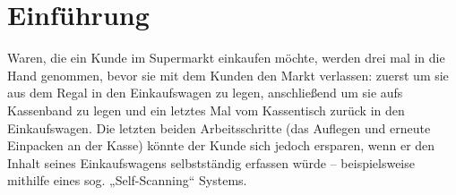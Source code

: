 \seKurzfassung[]




%
%
%
%
\seInhaltsverzeichnis[%
einrueckung=ja,
gliederungsebenen=4
]




%
%
%
%






%
\nocite{Gil:Evo}
\chapter{Einführung}
Waren, die ein Kunde im Supermarkt einkaufen möchte, werden drei mal in die Hand genommen, bevor sie mit dem Kunden den Markt verlassen: zuerst um sie aus dem Regal in den Einkaufswagen zu legen, anschließend um sie aufs Kassenband zu legen und ein letztes Mal vom Kassentisch zurück in den Einkaufswagen. Die letzten beiden Arbeitsschritte (das Auflegen und erneute Einpacken an der Kasse) könnte der Kunde sich jedoch ersparen, wenn er den Inhalt seines Einkaufswagens selbstständig erfassen würde -- beispielsweise mithilfe eines sog. „Self-Scanning“ Systems.


